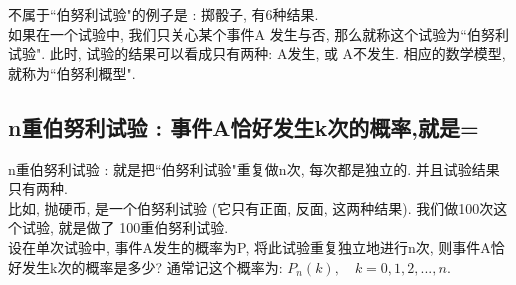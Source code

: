 \documentclass[UTF8]{ctexart}
\begin{document}
	不属于``伯努利试验"的例子是 : 掷骰子, 有6种结果. \\
	
	如果在一个试验中, 我们只关心某个事件A 发生与否, 那么就称这个试验为``伯努利试验". 此时, 试验的结果可以看成只有两种: A发生, 或 A不发生.  相应的数学模型, 就称为``伯努利概型". \\
	
	
	\subsection{ n重伯努利试验 : 事件A恰好发生k次的概率,就是= }
	
	n重伯努利试验 : 	就是把``伯努利试验"重复做n次, 每次都是独立的. 并且试验结果只有两种. \\
	比如, 抛硬币, 是一个伯努利试验 (它只有正面, 反面, 这两种结果). 我们做100次这个试验, 就是做了 100重伯努利试验. \\
	
	设在单次试验中, 事件A发生的概率为P, 将此试验重复独立地进行n次, 则事件A恰好发生k次的概率是多少? 通常记这个概率为: $ P_n(k), \quad  k= 0,1,2,...,n$.
	
	
	
	
	
	
	
	
	
\end{document}
